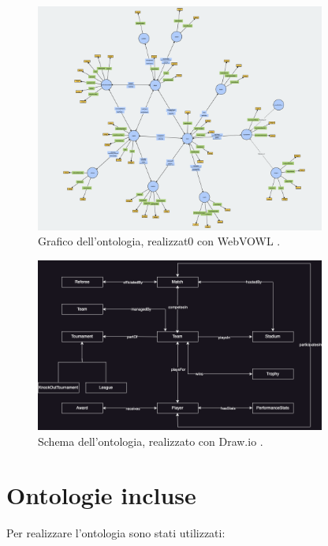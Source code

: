 \documentclass[11pt]{report} %
\begin{document}
\begin{figure}[H]
    \begin{center}
        \includegraphics[width=0.85\textwidth]{footology_2.1.png}
    \end{center}
    \caption{Grafico dell'ontologia, realizzat0 con WebVOWL \cite{webvowl,foot}.}
\end{figure}
\begin{figure}[H]
    \begin{center}
        \includegraphics[width=0.85\textwidth]{footology_v2.1_schema.png}
    \end{center}
    \caption{Schema dell'ontologia, realizzato con Draw.io \cite{drawio, foot}.}
\end{figure}
    
\section{Ontologie incluse}

Per realizzare l'ontologia sono stati utilizzati:
\end{document}
